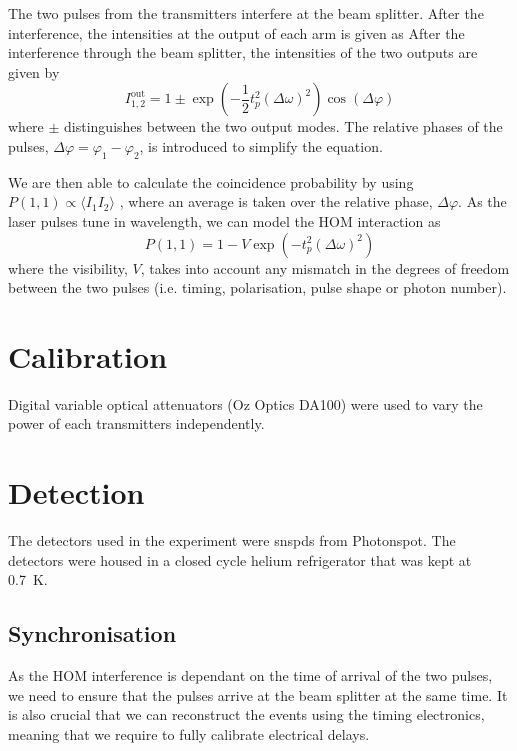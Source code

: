 {The two pulses from the transmitters interfere at the beam splitter. After the interference, the intensities at the output of each arm is given as
After the interference through the beam splitter, the intensities of the two outputs are given by
\begin{equation}
	I^\text{out}_{1,2} = 1 \pm \exp{\left(-\frac{1}{2}t_p^2(\Delta\omega)^2\right)}\cos(\Delta\varphi)
\end{equation}
where $\pm$ distinguishes between the two output modes. The relative phases of the pulses, $\Delta\varphi = \varphi_1 - \varphi_2$, is introduced to simplify the equation.

We are then able to calculate the coincidence probability by using $P(1,1) \propto \langle I_1 I_2\rangle$ \cite{Rarity2005}, where an average is taken over the relative phase, $\Delta\varphi$. As the laser pulses tune in wavelength, we can model the \ac{HOM} interaction as 
\begin{equation}
	P(1,1) = 1 - V \exp{\left(-t_p^2(\Delta\omega)^2\right)}
	\label{eq:gaussian}
\end{equation}
where the visibility, $V$, takes into account any mismatch in the degrees of freedom between the two pulses (i.e. timing, polarisation, pulse shape or photon number).

\section{Calibration}

Digital variable optical attenuators (Oz Optics DA100) were used to vary the power of each transmitters independently. 

\section{Detection}

The detectors used in the experiment were \acp{snspd} from Photonspot. The detectors were housed in a closed cycle helium refrigerator that was kept at \SI{0.7}{K}.

\subsection{Synchronisation}

As the \ac{HOM} interference is dependant on the time of arrival of the two pulses, we need to ensure that the pulses arrive at the beam splitter at the same time. It is also crucial that we can reconstruct the events using the timing electronics, meaning that we require to fully calibrate electrical delays. 

}
